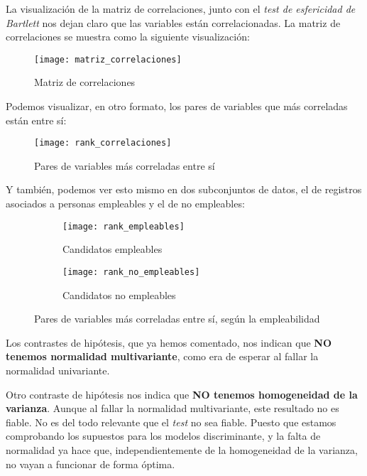 La visualización de la matriz de correlaciones, junto con el \textit{test de esfericidad de Bartlett} nos dejan claro que las variables están correlacionadas. La matriz de correlaciones se muestra como la siguiente visualización:

\begin{figure}[H]
    \centering
    \texttt{[image: matriz\_correlaciones]}
    \caption{Matriz de correlaciones}
    \label{figure:matriz_correlaciones}
\end{figure}

Podemos visualizar, en otro formato, los pares de variables que más correladas están entre sí:

\begin{figure}[H]
    \centering
    \texttt{[image: rank\_correlaciones]}
    \caption{Pares de variables más correladas entre sí}
    \label{figure:pares_variables_mas_correlacionadas}
\end{figure}

Y también, podemos ver esto mismo en dos subconjuntos de datos, el de registros asociados a personas empleables y el de no empleables:

\begin{figure}[H]
    \centering
    \begin{subfigure}{0.45\textwidth}
        \texttt{[image: rank\_empleables]}
        \caption{Candidatos empleables}
    \end{subfigure}
    \begin{subfigure}{0.45\textwidth}
        \texttt{[image: rank\_no\_empleables]}
        \caption{Candidatos no empleables}
    \end{subfigure}

    \caption{Pares de variables más correladas entre sí, según la empleabilidad}
    \label{figure:pares_variables_mas_correlacionadas_segun_empleabilidad}
\end{figure}

Los contrastes de hipótesis, que ya hemos comentado, nos indican que \textbf{NO tenemos normalidad multivariante}, como era de esperar al fallar la normalidad univariante.

Otro contraste de hipótesis nos indica que \textbf{NO tenemos homogeneidad de la varianza}. Aunque al fallar la normalidad multivariante, este resultado no es fiable. No es del todo relevante que el \textit{test} no sea fiable. Puesto que estamos comprobando los supuestos para los modelos discriminante, y la falta de normalidad ya hace que, independientemente de la homogeneidad de la varianza, no vayan a funcionar de forma óptima.

